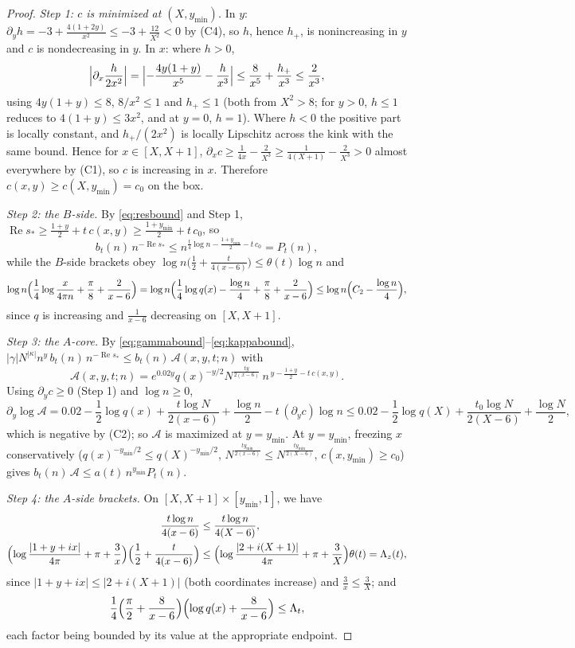 \documentclass[11pt]{article}
\theoremstyle{definition}
\DeclareMathOperator{\Rea}{Re}
\begin{document}
\begin{proof}
\emph{Step 1: $c$ is minimized at $(X,y_{\min})$.} In $y$:
$\partial_yh=-3+\frac{4(1+2y)}{x^2}\le-3+\frac{12}{X^2}<0$ by (C4),
so $h$, hence $h_+$, is nonincreasing in $y$ and $c$ is
nondecreasing in $y$. In $x$: where $h>0$,
\[
\Bigl|\partial_x\frac{h}{2x^2}\Bigr|
=\Bigl|-\frac{4y(1+y)}{x^5}-\frac{h}{x^3}\Bigr|
\le\frac{8}{x^5}+\frac{h_+}{x^3}\le\frac2{x^3},
\]
using $4y(1+y)\le8$, $8/x^2\le1$ and $h_+\le1$ (both from
$X^2>8$; for $y>0$, $h\le1$ reduces to $4(1+y)\le3x^2$, and at
$y=0$, $h=1$). Where $h<0$ the positive part is locally constant,
and $h_+/(2x^2)$ is locally Lipschitz across the kink with the same
bound. Hence for $x\in[X,X+1]$,
$\partial_xc\ge\frac1{4x}-\frac2{X^3}
\ge\frac1{4(X+1)}-\frac2{X^3}>0$ almost everywhere by (C1), so $c$
is increasing in $x$. Therefore $c(x,y)\ge c(X,y_{\min})=c_0$ on
the box.

\emph{Step 2: the $B$-side.} By \eqref{eq:resbound} and Step 1,
$\Rea s_*\ge\frac{1+y}2+t\,c(x,y)\ge\frac{1+y_{\min}}2+t\,c_0$, so
\[
b_t(n)\,n^{-\Rea s_*}
\le n^{\frac t4\log n-\frac{1+y_{\min}}2-t\,c_0}=P_t(n),
\]
while the $B$-side brackets obey
$\log n\bigl(\frac12+\frac t{4(x-6)}\bigr)\le\theta(t)\log n$ and
\[
\log n\Bigl(\frac14\log\frac x{4\pi n}+\frac\pi8+\frac2{x-6}\Bigr)
=\log n\Bigl(\frac14\log q(x)-\frac{\log n}4+\frac\pi8
+\frac2{x-6}\Bigr)
\le\log n\Bigl(C_2-\frac{\log n}4\Bigr),
\]
since $q$ is increasing and $\frac1{x-6}$ decreasing on $[X,X+1]$.

\emph{Step 3: the $A$-core.} By
\eqref{eq:gammabound}--\eqref{eq:kappabound},
$|\gamma|N^{|\kappa|}n^y\,b_t(n)\,n^{-\Rea s_*}\le
b_t(n)\,\mathcal A(x,y,t;n)$ with
\[
\mathcal A(x,y,t;n)
=e^{0.02y}q(x)^{-y/2}N^{\frac{ty}{2(x-6)}}\,
n^{\,y-\frac{1+y}2-t\,c(x,y)} .
\]
Using $\partial_yc\ge0$ (Step 1) and $\log n\ge0$,
\[
\partial_y\log\mathcal A
=0.02-\frac12\log q(x)+\frac{t\log N}{2(x-6)}
+\frac{\log n}2-t\,(\partial_yc)\log n
\le0.02-\frac12\log q(X)+\frac{t_0\log N}{2(X-6)}+\frac{\log N}2,
\]
which is negative by (C2); so $\mathcal A$ is maximized at
$y=y_{\min}$. At $y=y_{\min}$, freezing $x$ conservatively
($q(x)^{-y_{\min}/2}\le q(X)^{-y_{\min}/2}$,
$N^{\frac{ty_{\min}}{2(x-6)}}\le N^{\frac{ty_{\min}}{2(X-6)}}$,
$c(x,y_{\min})\ge c_0$) gives
$b_t(n)\,\mathcal A\le a(t)\,n^{y_{\min}}P_t(n)$.

\emph{Step 4: the $A$-side brackets.} On $[X,X+1]\times[y_{\min},1]$, we have
\begin{align*}
\frac{t\log n}{4(x-6)} &\le \frac{t\log n}{4(X-6)},
\\
\Bigl(\log\frac{|1+y+ix|}{4\pi}+\pi+\frac3x\Bigr)
\Bigl(\frac12+\frac t{4(x-6)}\Bigr)
&\le \Bigl(\log\frac{|2+i(X+1)|}{4\pi}+\pi+\frac3X\Bigr)
\theta(t)=\Lambda_z(t),
\end{align*}
since $|1+y+ix|\le|2+i(X+1)|$ (both coordinates increase) and
$\frac3x\le\frac3X$; and
\[
\frac14\Bigl(\frac\pi2+\frac8{x-6}\Bigr)
\Bigl(\log q(x)+\frac8{x-6}\Bigr)\le\Lambda_t,
\]
each factor being bounded by its value at the appropriate endpoint.


\end{proof}
\end{document}
